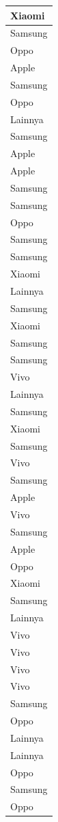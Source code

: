 \documentclass[
  letterpaper,
  DIV=11,
  numbers=noendperiod]{scrartcl}
\begin{document}
\begin{table}
\begin{tabular}[t]{l}
\hline
Xiaomi\\
\hline
Samsung\\
\hline
Oppo\\
\hline
Apple\\
\hline
Samsung\\
\hline
Oppo\\
\hline
Lainnya\\
\hline
Samsung\\
\hline
Apple\\
\hline
Apple\\
\hline
Samsung\\
\hline
Samsung\\
\hline
Oppo\\
\hline
Samsung\\
\hline
Samsung\\
\hline
Xiaomi\\
\hline
Lainnya\\
\hline
Samsung\\
\hline
Xiaomi\\
\hline
Samsung\\
\hline
Samsung\\
\hline
Vivo\\
\hline
Lainnya\\
\hline
Samsung\\
\hline
Xiaomi\\
\hline
Samsung\\
\hline
Vivo\\
\hline
Samsung\\
\hline
Apple\\
\hline
Vivo\\
\hline
Samsung\\
\hline
Apple\\
\hline
Oppo\\
\hline
Xiaomi\\
\hline
Samsung\\
\hline
Lainnya\\
\hline
Vivo\\
\hline
Vivo\\
\hline
Vivo\\
\hline
Vivo\\
\hline
Samsung\\
\hline
Oppo\\
\hline
Lainnya\\
\hline
Lainnya\\
\hline
Oppo\\
\hline
Samsung\\
\hline
Oppo\\

\end{tabular}
\end{table}
\end{document}

